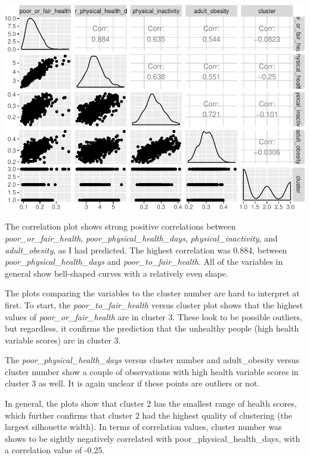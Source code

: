 \documentclass[12pt,twoside]{amherstthesis}
\begin{document}
  \begin{center}\includegraphics{Comps_Proj_files/figure-latex/unnamed-chunk-18-1} \end{center}
  
  The correlation plot shows strong positive correlations between
  \emph{poor\_or\_fair\_health}, \emph{poor\_physical\_health\_days},
  \emph{physical\_inactivity}, and \emph{adult\_obesity}, as I had
  predicted. The highest correlation was 0.884, between
  \emph{poor\_physical\_health\_days} and \emph{poor\_to\_fair\_health}.
  All of the variables in general show bell-shaped curves with a
  relatively even shape.
  
  The plots comparing the variables to the cluster number are hard to
  interpret at first. To start, the \emph{poor\_to\_fair\_health} versus
  cluster plot shows that the highest values of
  \emph{poor\_or\_fair\_health} are in cluster 3. These look to be
  possible outliers, but regardless, it confirms the prediction that the
  unhealthy people (high health variable scores) are in cluster 3.
  
  The \emph{poor\_physical\_health\_days} versus cluster number and
  adult\_obesity versus cluster number show a couple of observations with
  high health variable scores in cluster 3 as well. It is again unclear if
  these points are outliers or not.
  
  In general, the plots show that cluster 2 has the smallest range of
  health scores, which further confirms that cluster 2 had the highest
  quality of clustering (the largest silhouette width). In terms of
  correlation values, cluster number was shows to be sightly negatively
  correlated with poor\_physical\_health\_days, with a correlation value
  of -0.25.
  
\end{document}
